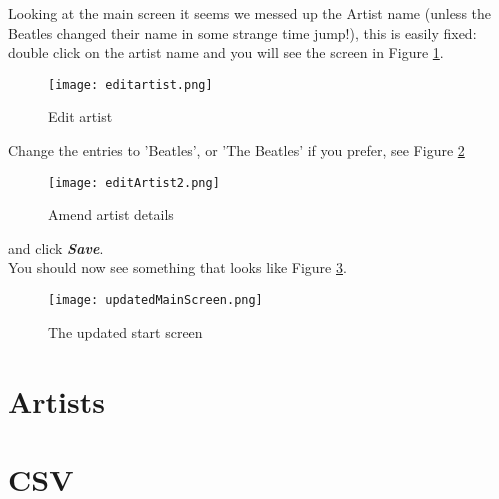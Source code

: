 Looking at the main screen it seems we messed up the Artist name (unless the Beatles changed their name in some strange time jump!), this is easily fixed: double click on the artist name and you will see the screen in Figure
\ref{fig:Edit artist}.
\begin{figure}[!h]
 \texttt{[image: editartist.png]}
 \caption{Edit artist}
 \label{fig:Edit artist}
\end{figure} 
\newpage
Change the entries to 'Beatles', or 'The Beatles' if you prefer, see Figure
\ref{fig:Corrected artist}
\begin{figure}[!h]
 \texttt{[image: editArtist2.png]}
 \caption{Amend artist details}
 \label{fig:Corrected artist}
\end{figure} 
and click 
\textbf{\textit{Save}}.
\\You should now see something that looks like Figure
\ref{fig:Updated start screen}.
\begin{figure}[!h]
 \texttt{[image: updatedMainScreen.png]}
 \caption{The updated start screen}
 \label{fig:Updated start screen}
\end{figure} 
\newpage
\section{Artists}
\section{CSV}
\label{sect:csv}